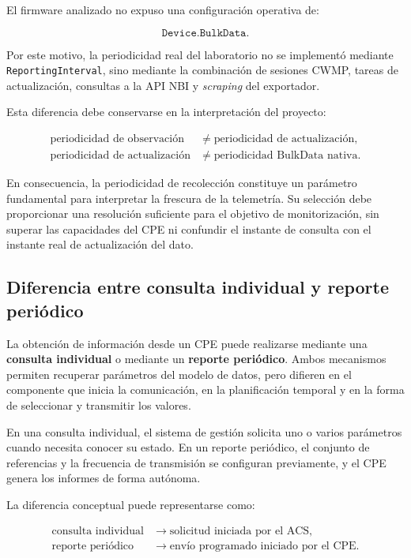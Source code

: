 El firmware analizado no expuso una configuración operativa de:

\[
    \texttt{Device.BulkData.}
\]

Por este motivo, la periodicidad real del laboratorio no se implementó
mediante \texttt{ReportingInterval}, sino mediante la combinación de
sesiones CWMP, tareas de actualización, consultas a la API NBI y
\textit{scraping} del exportador.

Esta diferencia debe conservarse en la interpretación del proyecto:

\[
\begin{aligned}
    \text{periodicidad de observación}
    &\neq
    \text{periodicidad de actualización},\\
    \text{periodicidad de actualización}
    &\neq
    \text{periodicidad BulkData nativa}.
\end{aligned}
\]

En consecuencia, la periodicidad de recolección constituye un parámetro
fundamental para interpretar la frescura de la telemetría. Su selección
debe proporcionar una resolución suficiente para el objetivo de
monitorización, sin superar las capacidades del CPE ni confundir el
instante de consulta con el instante real de actualización del dato.

\subsection{Diferencia entre consulta individual y reporte periódico}
\label{subsec:diferencia-consulta-individual-reporte-periodico}

La obtención de información desde un CPE puede realizarse mediante una
\textbf{consulta individual} o mediante un \textbf{reporte periódico}.
Ambos mecanismos permiten recuperar parámetros del modelo de datos, pero
difieren en el componente que inicia la comunicación, en la planificación
temporal y en la forma de seleccionar y transmitir los valores.

En una consulta individual, el sistema de gestión solicita uno o varios
parámetros cuando necesita conocer su estado. En un reporte periódico, el
conjunto de referencias y la frecuencia de transmisión se configuran
previamente, y el CPE genera los informes de forma autónoma.

La diferencia conceptual puede representarse como:

\[
\begin{aligned}
    \text{consulta individual}
    &\longrightarrow
    \text{solicitud iniciada por el ACS},\\
    \text{reporte periódico}
    &\longrightarrow
    \text{envío programado iniciado por el CPE}.
\end{aligned}
\]

